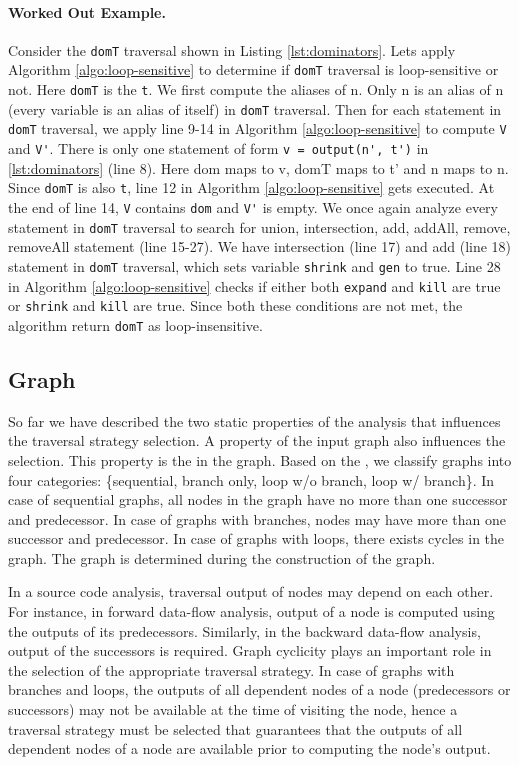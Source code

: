 \paragraph{Worked Out Example.} Consider the \lstinline|domT| traversal shown in Listing
\ref{lst:dominators}. Lets apply Algorithm \ref{algo:loop-sensitive} to determine if \lstinline|domT| traversal is loop-sensitive or not. Here \lstinline|domT| is the \lstinline|t|. We first compute the aliases of n. Only n is an alias of n (every variable is an alias of itself) in \lstinline|domT| traversal. Then for each statement in \lstinline|domT| traversal, we apply line 9-14 in Algorithm \ref{algo:loop-sensitive} to compute \lstinline|V| and \lstinline|V'|. There is only one statement of form \lstinline|v = output(n', t')| in \ref{lst:dominators} (line 8). Here dom maps to v, domT maps to t' and n maps to n. Since \lstinline|domT| is also \lstinline|t|, line 12 in Algorithm \ref{algo:loop-sensitive} gets executed. At the end of line 14, \lstinline|V| contains \lstinline|dom| and \lstinline|V'| is empty. We once again analyze every statement in \lstinline|domT| traversal to search for union, intersection, add, addAll, remove, removeAll statement (line 15-27). We have intersection (line 17) and add (line 18) statement in \lstinline|domT| traversal, which sets variable \lstinline|shrink| and \lstinline|gen| to true. Line 28 in Algorithm \ref{algo:loop-sensitive} checks if either both \lstinline|expand| and \lstinline|kill| are true or \lstinline|shrink| and \lstinline|kill| are true. Since both these conditions are not met, the algorithm return \lstinline|domT| as loop-insensitive.
\subsection{Graph \Graphprop}
So far we have described the two static properties of the analysis that
influences the traversal strategy selection. A property of the input graph
also influences the selection. This property is the \graphprop{} in the
graph. Based on the \graphprop{}, we classify graphs into four categories:
\{sequential, branch only, loop w/o branch, loop w/ branch\}. In case of
sequential graphs, all nodes in the graph have no more than one successor and
predecessor. In case of graphs with branches, nodes may have more than one
successor and predecessor. In case of graphs with loops, there exists cycles in
the graph. The graph \graphprop{} is determined during the construction of the
graph.

In a source code analysis, traversal output of nodes may depend on each other.
For instance, in forward data-flow analysis, output of a node is computed using
the outputs of its predecessors. Similarly, in the backward data-flow analysis,
output of the successors is required.
Graph cyclicity plays an important role in the selection of the appropriate
traversal strategy. In case of graphs with branches and loops, the outputs of
all dependent nodes of a node (predecessors or successors) may not be available
at the time of visiting the node, hence a traversal strategy must be selected
that guarantees that the outputs of all dependent nodes of a node are available
prior to computing the node's output. 

